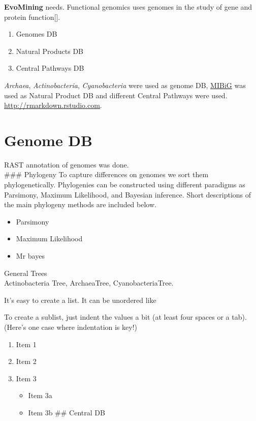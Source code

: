 \documentclass[12pt,twoside]{reedthesis}
\providecommand{\tightlist}{%
  \setlength{\itemsep}{0pt}\setlength{\parskip}{0pt}}
\begin{document}
  \textbf{EvoMining} needs. Functional genomics uses genomes in the study
  of gene and protein function{[}{]}.
  
  \begin{enumerate}
  \def\labelenumi{\arabic{enumi}.}
  \tightlist
  \item
    Genomes DB
  \item
    Natural Products DB
  \item
    Central Pathways DB
  \end{enumerate}
  
  \emph{Archaea}, \emph{Actinobacteria}, \emph{Cyanobacteria} were used as
  genome DB, \href{http://mibig.secondarymetabolites.org/}{MIBiG} was used
  as Natural Product DB and different Central Pathways were used.
  \url{http://rmarkdown.rstudio.com}.
  
  \section{Genome DB}\label{genome-db}
  
  RAST annotation of genomes was done.\\
  \#\#\# Phylogeny To capture differences on genomes we sort them
  phylogenetically. Phylogenies can be constructed using different
  paradigms as Parsimony, Maximum Likelihood, and Bayesian inference.
  Short descriptions of the main phylogeny methods are included below.
  
  \begin{itemize}
  \tightlist
  \item
    Parsimony
  \item
    Maximum Likelihood
  \item
    Mr bayes
  \end{itemize}
  
  General Trees\\
  Actinobacteria Tree, ArchaeaTree, CyanobacteriaTree.
  
  It's easy to create a list. It can be unordered like
  
  To create a sublist, just indent the values a bit (at least four spaces
  or a tab). (Here's one case where indentation is key!)
  
  \begin{enumerate}
  \def\labelenumi{\arabic{enumi}.}
  \tightlist
  \item
    Item 1
  \item
    Item 2
  \item
    Item 3
  
    \begin{itemize}
    \tightlist
    \item
      Item 3a
    \item
      Item 3b \#\# Central DB
    \end{itemize}
  \end{enumerate}
  
\end{document}
